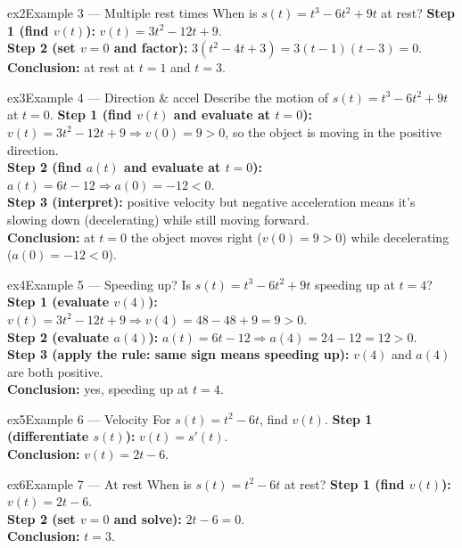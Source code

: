 \documentclass[11pt]{article}
\begin{document}
\begin{example}{ex2}{Example 3 --- Multiple rest times}
When is $s(t)=t^3-6t^2+9t$ at rest?\soln
\textbf{Step 1 (find $v(t)$):} $v(t)=3t^2-12t+9$.\\[3pt]
\textbf{Step 2 (set $v=0$ and factor):} $3(t^2-4t+3)=3(t-1)(t-3)=0$.\\[3pt]
\textbf{Conclusion:} at rest at $t=1$ and $t=3$.
\end{example}

\begin{example}{ex3}{Example 4 --- Direction \& accel}
Describe the motion of $s(t)=t^3-6t^2+9t$ at $t=0$.\soln
\textbf{Step 1 (find $v(t)$ and evaluate at $t=0$):} $v(t)=3t^2-12t+9\Rightarrow v(0)=9>0$, so the object is moving in the positive direction.\\[3pt]
\textbf{Step 2 (find $a(t)$ and evaluate at $t=0$):} $a(t)=6t-12\Rightarrow a(0)=-12<0$.\\[3pt]
\textbf{Step 3 (interpret):} positive velocity but negative acceleration means it's slowing down (decelerating) while still moving forward.\\[3pt]
\textbf{Conclusion:} at $t=0$ the object moves right ($v(0)=9>0$) while decelerating ($a(0)=-12<0$).
\end{example}

\begin{example}{ex4}{Example 5 --- Speeding up?}
Is $s(t)=t^3-6t^2+9t$ speeding up at $t=4$?\soln
\textbf{Step 1 (evaluate $v(4)$):} $v(t)=3t^2-12t+9\Rightarrow v(4)=48-48+9=9>0$.\\[3pt]
\textbf{Step 2 (evaluate $a(4)$):} $a(t)=6t-12\Rightarrow a(4)=24-12=12>0$.\\[3pt]
\textbf{Step 3 (apply the rule: same sign means speeding up):} $v(4)$ and $a(4)$ are both positive.\\[3pt]
\textbf{Conclusion:} yes, speeding up at $t=4$.
\end{example}

\begin{example}{ex5}{Example 6 --- Velocity}
For $s(t)=t^2-6t$, find $v(t)$.\soln
\textbf{Step 1 (differentiate $s(t)$):} $v(t)=s'(t)$.\\[3pt]
\textbf{Conclusion:} $v(t)=2t-6$.
\end{example}

\begin{example}{ex6}{Example 7 --- At rest}
When is $s(t)=t^2-6t$ at rest?\soln
\textbf{Step 1 (find $v(t)$):} $v(t)=2t-6$.\\[3pt]
\textbf{Step 2 (set $v=0$ and solve):} $2t-6=0$.\\[3pt]
\textbf{Conclusion:} $t=3$.
\end{example}
\end{document}
